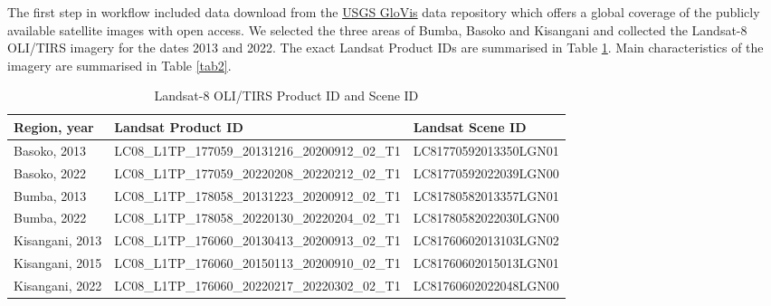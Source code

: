 \documentclass[applsci,article,submit,pdftex,moreauthors]{Definitions/mdpi}
\begin{document}
The first step in workflow included data download from the \href{https://glovis.usgs.gov/app}{USGS GloVis} data repository which offers a global coverage of the publicly available satellite images with open access. We selected the three areas of Bumba, Basoko and Kisangani and collected the Landsat-8 OLI/TIRS imagery for the dates 2013 and 2022. The exact Landsat Product IDs are summarised in Table \ref{tab1}. Main characteristics of the imagery are summarised in Table \ref{tab2}. 
\begin{table}[H] 
\caption{Landsat-8 OLI/TIRS Product ID and Scene ID \label{tab1}}
	\begin{tabularx}{\textwidth}{| p{2.3cm} | p{6.3cm} | p{5.3cm} |}
\toprule
\textbf{Region, year} & \textbf{Landsat Product ID} & \textbf{Landsat Scene ID}\\
\midrule
	Basoko, 2013 & LC08\_L1TP\_177059\_20131216\_20200912\_02\_T1 & LC81770592013350LGN01\\
	Basoko, 2022 & LC08\_L1TP\_177059\_20220208\_20220212\_02\_T1 & LC81770592022039LGN00 \\
	Bumba, 2013 & LC08\_L1TP\_178058\_20131223\_20200912\_02\_T1 & LC81780582013357LGN01 \\
	Bumba, 2022 & LC08\_L1TP\_178058\_20220130\_20220204\_02\_T1 & LC81780582022030LGN00 \\
	Kisangani, 2013 & LC08\_L1TP\_176060\_20130413\_20200913\_02\_T1 & LC81760602013103LGN02 \\
	Kisangani, 2015 & LC08\_L1TP\_176060\_20150113\_20200910\_02\_T1 & LC81760602015013LGN01 \\
	Kisangani, 2022 & LC08\_L1TP\_176060\_20220217\_20220302\_02\_T1 & LC81760602022048LGN00 \\
\bottomrule
\end{tabularx}
\end{table}
\end{document}
